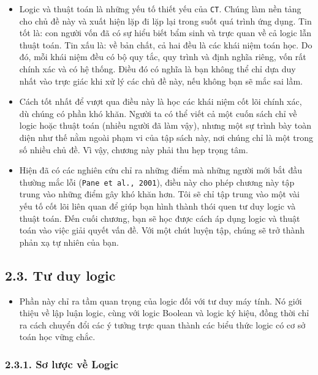 \begin{itemize}
    \item Logic và thuật toán là những yếu tố thiết yếu của \texttt{CT}. Chúng làm nền tảng cho chủ đề này và xuất hiện lặp đi lặp lại trong suốt quá trình ứng dụng. Tin tốt là: con người vốn đã có sự hiểu biết bẩm sinh và trực quan về cả logic lẫn thuật toán. Tin xấu là: về bản chất, cả hai đều là các khái niệm toán học. Do đó, mỗi khái niệm đều có bộ quy tắc, quy trình và định nghĩa riêng, vốn rất chính xác và có hệ thống. Điều đó có nghĩa là bạn không thể chỉ dựa duy nhất vào trực giác khi xử lý các chủ đề này, nếu không bạn sẽ mắc sai lầm.

    \item Cách tốt nhất để vượt qua điều này là học các khái niệm cốt lõi chính xác, dù chúng có phần khó khăn. Người ta có thể viết cả một cuốn sách chỉ về logic hoặc thuật toán (nhiều người đã làm vậy), nhưng một sự trình bày toàn diện như thế nằm ngoài phạm vi của tập sách này, nơi chúng chỉ là một trong số nhiều chủ đề. Vì vậy, chương này phải thu hẹp trọng tâm.

    \item Hiện đã có các nghiên cứu chỉ ra những điểm mà những người mới bắt đầu thường mắc lỗi (\texttt{Pane et al., 2001}), điều này cho phép chương này tập trung vào những điểm gây khó khăn hơn. Tôi sẽ chỉ tập trung vào một vài yếu tố cốt lõi liên quan để giúp bạn hình thành thói quen tư duy logic và thuật toán. Đến cuối chương, bạn sẽ học được cách áp dụng logic và thuật toán vào việc giải quyết vấn đề. Với một chút luyện tập, chúng sẽ trở thành phản xạ tự nhiên của bạn.
\end{itemize}

\subsection*{2.3. Tư duy logic}

\begin{itemize}
    \item Phần này chỉ ra tầm quan trọng của logic đối với tư duy máy tính. Nó giới thiệu về lập luận logic, cùng với logic Boolean và logic ký hiệu, đồng thời chỉ ra cách chuyển đổi các ý tưởng trực quan thành các biểu thức logic có cơ sở toán học vững chắc.
\end{itemize}

\subsubsection*{2.3.1. Sơ lược về Logic}

